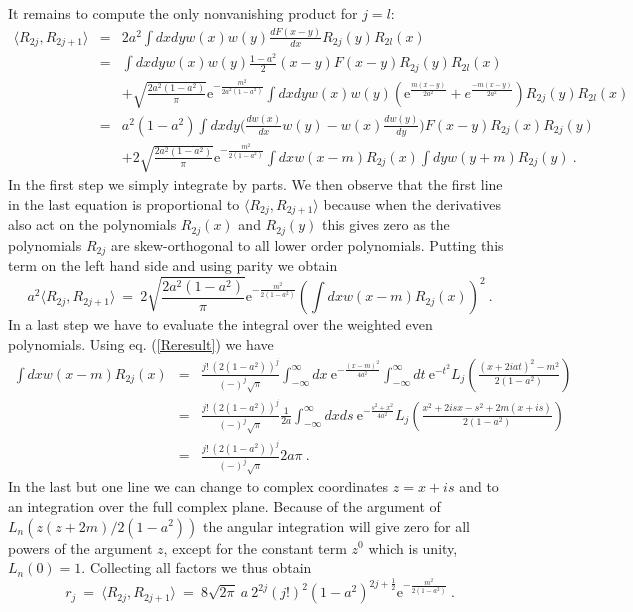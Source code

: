 \documentclass[11pt]{article}
\newcommand{\be}{\begin{equation}}
\newcommand{\ee}{\end{equation}}
\newcommand{\bea}{\begin{eqnarray}}
\newcommand{\eea}{\end{eqnarray}}
\newcommand{\nn}{\nonumber}
\newcommand{\e}{\mbox{e}}
\begin{document}
\begin{appendix}
It remains to compute the only nonvanishing product for $j=l$:
\bea
\langle R_{2j}, R_{2j+1}\rangle&=& 2a^2 \int dxdy w(x) w(y)
\frac{dF(x-y)}{dx} R_{2j}(y) R_{2l}(x)\nn\\
&=& \int dxdy w(x) w(y) \frac{1-a^2}{2}(x-y)F(x-y) R_{2j}(y) R_{2l}(x)\nn\\
&&+\sqrt{\frac{2a^2(1-a^2)}{\pi}}\e^{-\frac{m^2}{2a^2(1-a^2)}}
\int dxdy w(x) w(y)\left(
  \e^{\frac{m(x-y)}{2a^2}}+e^{\frac{-m(x-y)}{2a^2}}\right)R_{2j}(y)
R_{2l}(x)\nn\\
&=& a^2(1-a^2)\int dxdy \Big(\frac{dw(x)}{dx}
w(y)-w(x)\frac{dw(y)}{dy}\Big)F(x-y)R_{2j}(x)R_{2j}(y)\nn\\
&&+2\sqrt{\frac{2a^2(1-a^2)}{\pi}}\e^{-\frac{m^2}{2(1-a^2)}}
\int dx w(x-m) R_{2j}(x) \int dy w(y+m)R_{2j}(y) \ .
\eea
In the first step we simply integrate by parts. We then observe that
the first line in the last equation is proportional to $\langle
R_{2j}, R_{2j+1}\rangle$ because when the derivatives also act on the
polynomials $R_{2j}(x)$ and $R_{2j}(y)$ this gives zero as the
polynomials $R_{2j}$ are skew-orthogonal to all lower order
polynomials. Putting this term on the left hand side and using parity
we obtain
\be
a^2\langle R_{2j}, R_{2j+1}\rangle
\ =\ 2\sqrt{\frac{2a^2(1-a^2)}{\pi}}\e^{-\frac{m^2}{2(1-a^2)}}
\left(\int dx w(x-m) R_{2j}(x)\right)^2 \ .
\ee
In a last step we have to evaluate the integral over the weighted even
polynomials. Using eq. (\ref{Reresult}) we have
\bea
\int dx w(x-m)R_{2j}(x)&=& \frac{j!\,(2(1-a^2))^{j}}{(-)^j\sqrt{\pi}}
\int_{-\infty}^\infty  dx\
\e^{-\frac{(x-m)^2}{4a^2}}\int_{-\infty}^\infty  dt\ \e^{-t^2}
L_j\left( \frac{(x+2iat)^2-m^2}{2(1-a^2)}\right)\nn\\
&=& \frac{j!\,(2(1-a^2))^{j}}{(-)^j\sqrt{\pi}}
\frac{1}{2a}\int_{-\infty}^\infty  dxds\ \e^{-\frac{s^2+x^2}{4a^2}}
L_j\left( \frac{x^2+2isx-s^2+2m(x+is)}{2(1-a^2)}\right)\nn\\
&=&\frac{j!\,(2(1-a^2))^{j}}{(-)^j\sqrt{\pi}}2a\pi\ .
\label{normint}
\eea
In the last but one line we can change to complex coordinates $z=x+is$
and to an integration over the full complex plane. Because of the
argument of $L_n(z(z+2m)/2(1-a^2))$ the angular integration will give
zero for all powers of the argument $z$, except for the constant term
$z^0$ which
is unity, $L_n(0)=1$. Collecting all factors we thus obtain
\be
r_j\ =\ \langle R_{2j}, R_{2j+1}\rangle\ =\
8\sqrt{2\pi}\ a\ 2^{2j} (j!)^2 (1-a^2)^{2j+\frac12}\e^{-\frac{m^2}{2(1-a^2)}}\ .
\ee

\end{appendix}
\end{document}
